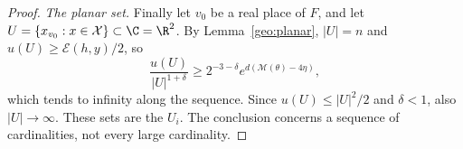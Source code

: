 \begin{proof}
\emph{The planar set.} Finally let $v_0$ be a real place of $F$, and let
$U=\{x_{v_0}:x\in\mathcal X\}\subset\C=\R^2$. By
Lemma~\ref{geo:planar}, $|U|=n$ and $u(U)\ge\mathcal E(h,y)/2$, so
\[
 \frac{u(U)}{|U|^{1+\delta}}
 \ge2^{-3-\delta}e^{d(\mathcal M(\theta)-4\eta)},
\]
which tends to infinity along the sequence. Since $u(U)\le|U|^2/2$ and
$\delta<1$, also $|U|\to\infty$. These sets are the $U_i$. The
conclusion concerns a sequence of cardinalities, not every large
cardinality.
\end{proof}
